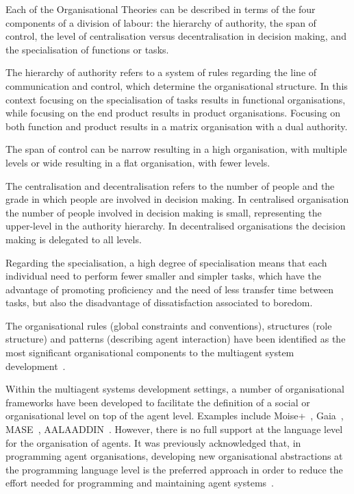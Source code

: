 \documentclass[a4paper,12pt,oneside,fleqn]{book} %
\begin{document}
Each of the Organisational Theories can be described in terms of the four
components of a division of labour: the hierarchy of authority, the span of
control, the level of centralisation versus decentralisation in decision
making, and the specialisation of functions or tasks.

The hierarchy of authority refers to a system of rules regarding the line
of communication and control, which determine the organisational structure.
In this context focusing on the specialisation of tasks results in
functional organisations, while focusing on the end product results in
product organisations. Focusing on both function and product results in a
matrix organisation with a dual authority.

The span of control can be narrow resulting in a high organisation, with
multiple levels or wide resulting in a flat organisation, with fewer levels.

The centralisation and decentralisation refers to the number of people and
the grade in which people are involved in decision making. In centralised
organisation the number of people involved in decision making is small,
representing the upper-level in the authority hierarchy. In decentralised
organisations the decision making is delegated to all levels.

Regarding the specialisation, a high degree of specialisation means that
each individual need to perform fewer smaller and simpler tasks, which have
the advantage of promoting proficiency and the need of less transfer time
between tasks, but also the disadvantage of dissatisfaction associated to
boredom.

The organisational rules (global constraints and conventions), structures
(role structure) and patterns (describing agent interaction) have been
identified as the most significant organisational components to the
multiagent system development~\cite{DBLP:conf/aose/ZambonelliJW00}.

Within the multiagent systems development settings, a number of
organisational frameworks have been developed to facilitate the definition
of a social or organisational level on top of the agent level. Examples
include Moise+~\cite{DBLP:conf/atal/HubnerSB02},
Gaia~\cite{DBLP:journals/aamas/WooldridgeJK00},
MASE~\cite{deloach2001analysis}, AALAADDIN~\cite{ferber1998meta}.  However,
there is no full support at the language level for the organisation of
agents. It was previously acknowledged that, in programming agent
organisations, developing new organisational abstractions at the
programming language level is the preferred approach in order to reduce the
effort needed for programming and maintaining agent
systems~\cite{DBLP:conf/esaw/RiemsdijkHJ09}.
\end{document}
